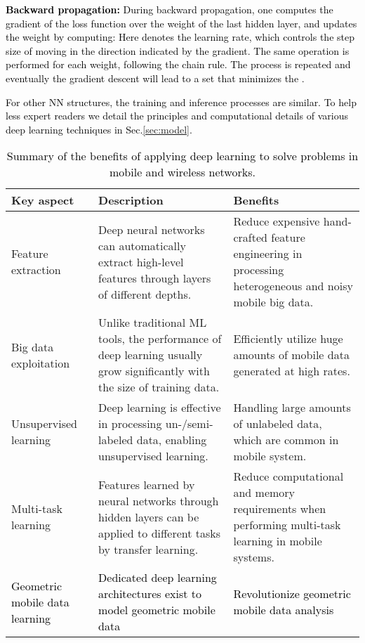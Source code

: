 \documentclass[journal,comsoc,letter]{IEEEtran}
\newcommand{\edit}[1]{\textcolor{black}{#1}}
\newcommand{\rev}[1]{\textcolor{black}{#1}}
\begin{document}
\noindent\edit{\textbf{Backward propagation:} During backward propagation, one computes the gradient of the loss function  over the weight of the last hidden layer, and updates the weight by computing:
}
\noindent\edit{Here  denotes the learning rate, which controls the step size of moving in the direction indicated by the gradient. The same operation is performed for each weight, following the chain rule. The process is repeated and eventually the gradient descent will lead to a set  that minimizes the .}

\edit{For other NN structures, the training and inference processes are similar. To help less expert readers we detail the principles and computational details of various deep learning techniques in Sec.\ref{sec:model}.}

\begin{table}[ht]
\centering
\caption{\edit{Summary of the benefits of applying deep learning to solve problems in mobile and wireless networks.}}
\label{tab:advantage}
\color{black}
\begin{tabular}{|C{1.5cm}|C{3cm}|C{3cm}|}
\hline
\textbf{Key aspect}    & \textbf{Description}                                                                                                     & \textbf{Benefits}                                                                                         \\ \hline
Feature extraction    & Deep neural networks can automatically extract high-level features through layers of different depths.                    & Reduce expensive hand-crafted feature engineering in processing heterogeneous and noisy mobile big data. \\ \hline
Big data exploitation      & Unlike traditional ML tools, the performance of deep learning usually grow significantly with the size of training data. & Efficiently utilize huge amounts of mobile data generated at high rates.                          \\ \hline
Unsupervised learning & Deep learning is effective in processing un-/semi- labeled data, enabling unsupervised learning.    & Handling large amounts of unlabeled data, which are common in mobile system.                      \\ \hline
Multi-task learning   & Features learned by neural networks through hidden layers can be applied to different tasks by transfer learning.              & Reduce computational and memory requirements when performing multi-task learning in mobile systems.      \\ \hline
\rev{Geometric mobile data learning}   & \rev{Dedicated deep learning architectures exist to model geometric mobile data}              & \rev{Revolutionize geometric mobile data analysis}      \\ \hline
\end{tabular}
\end{table}
\end{document}

